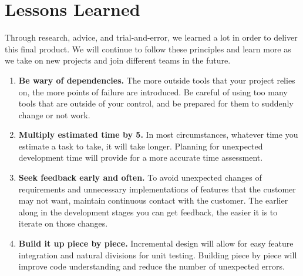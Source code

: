 \section{Lessons Learned}
Through research, advice, and trial-and-error, we learned a lot in order to deliver this final product. We will continue to follow these principles and learn more as we take on new projects and join different teams in the future.
\begin{enumerate}
	\item \textbf{Be wary of dependencies.} The more outside tools that your project relies on, the more points of failure are introduced. Be careful of using too many tools that are outside of your control, and be prepared for them to suddenly change or not work.
	\item \textbf{Multiply estimated time by 5.} In most circumstances, whatever time you estimate a task to take, it will take longer. Planning for unexpected development time will provide for a more accurate time assessment. 
	\item \textbf{Seek feedback early and often.} To avoid unexpected changes of requirements and unnecessary implementations of features that the customer may not want, maintain continuous contact with the customer. The earlier along in the development stages you can get feedback, the easier it is to iterate on those changes.
	\item \textbf{Build it up piece by piece.} Incremental design will allow for easy feature integration and natural divisions for unit testing. Building piece by piece will improve code understanding and reduce the number of unexpected errors.
\end{enumerate}

